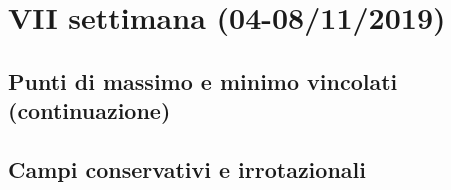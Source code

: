 \chapter{VII settimana (04-08/11/2019)}

\section{Punti di massimo e minimo vincolati (continuazione)}


\newpage

\section{Campi conservativi e irrotazionali}


\newpage

